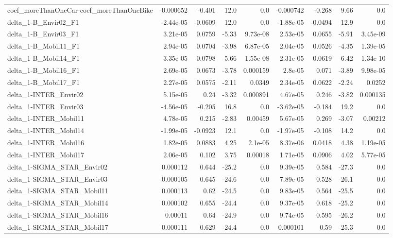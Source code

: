 \begin{tabular}{lrrrrrrrr}
coef_moreThanOneCar-coef_moreThanOneBike & -0.000652 & -0.401 & 12.0 & 0.0 & -0.000742 & -0.268 & 9.66 & 0.0 \\
delta_1-B_Envir02_F1 & -2.44e-05 & -0.0609 & 12.0 & 0.0 & -1.88e-05 & -0.0494 & 12.9 & 0.0 \\
delta_1-B_Envir03_F1 & 3.21e-05 & 0.0759 & -5.33 & 9.73e-08 & 2.53e-05 & 0.0655 & -5.91 & 3.45e-09 \\
delta_1-B_Mobil11_F1 & 2.94e-05 & 0.0704 & -3.98 & 6.87e-05 & 2.04e-05 & 0.0526 & -4.35 & 1.39e-05 \\
delta_1-B_Mobil14_F1 & 3.35e-05 & 0.0798 & -5.66 & 1.55e-08 & 2.31e-05 & 0.0619 & -6.42 & 1.34e-10 \\
delta_1-B_Mobil16_F1 & 2.69e-05 & 0.0673 & -3.78 & 0.000159 & 2.8e-05 & 0.071 & -3.89 & 9.98e-05 \\
delta_1-B_Mobil17_F1 & 2.27e-05 & 0.0575 & -2.11 & 0.0349 & 2.34e-05 & 0.0622 & -2.24 & 0.0252 \\
delta_1-INTER_Envir02 & 5.15e-05 & 0.24 & -3.32 & 0.000891 & 4.67e-05 & 0.246 & -3.82 & 0.000135 \\
delta_1-INTER_Envir03 & -4.56e-05 & -0.205 & 16.8 & 0.0 & -3.62e-05 & -0.184 & 19.2 & 0.0 \\
delta_1-INTER_Mobil11 & 4.78e-05 & 0.215 & -2.83 & 0.00459 & 5.67e-05 & 0.269 & -3.07 & 0.00212 \\
delta_1-INTER_Mobil14 & -1.99e-05 & -0.0923 & 12.1 & 0.0 & -1.97e-05 & -0.108 & 14.2 & 0.0 \\
delta_1-INTER_Mobil16 & 1.82e-05 & 0.0883 & 4.25 & 2.1e-05 & 8.37e-06 & 0.0418 & 4.38 & 1.19e-05 \\
delta_1-INTER_Mobil17 & 2.06e-05 & 0.102 & 3.75 & 0.00018 & 1.71e-05 & 0.0906 & 4.02 & 5.77e-05 \\
delta_1-SIGMA_STAR_Envir02 & 0.000112 & 0.644 & -25.2 & 0.0 & 9.39e-05 & 0.584 & -27.3 & 0.0 \\
delta_1-SIGMA_STAR_Envir03 & 0.000105 & 0.645 & -24.6 & 0.0 & 7.89e-05 & 0.528 & -26.1 & 0.0 \\
delta_1-SIGMA_STAR_Mobil11 & 0.000113 & 0.62 & -24.5 & 0.0 & 9.83e-05 & 0.564 & -25.5 & 0.0 \\
delta_1-SIGMA_STAR_Mobil14 & 0.000102 & 0.655 & -24.4 & 0.0 & 9.37e-05 & 0.618 & -25.2 & 0.0 \\
delta_1-SIGMA_STAR_Mobil16 & 0.00011 & 0.64 & -24.9 & 0.0 & 9.74e-05 & 0.595 & -26.2 & 0.0 \\
delta_1-SIGMA_STAR_Mobil17 & 0.000111 & 0.629 & -24.4 & 0.0 & 0.000101 & 0.59 & -25.3 & 0.0 \\

\end{tabular}
